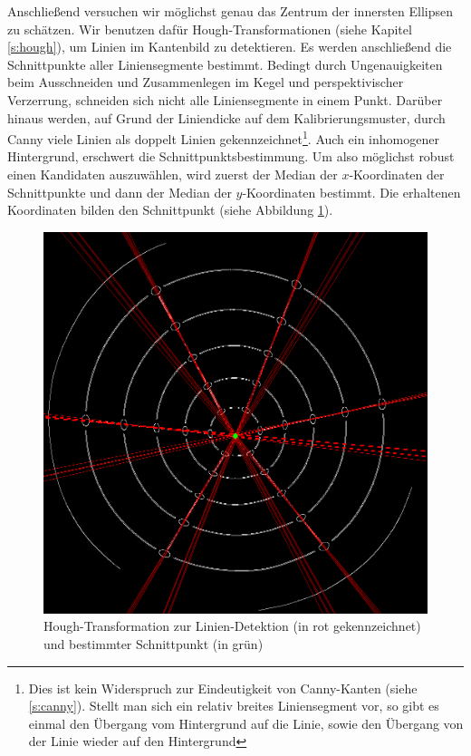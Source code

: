 Anschließend versuchen wir möglichst genau das Zentrum der innersten Ellipsen zu schätzen.
Wir benutzen dafür Hough-Transformationen (siehe Kapitel \ref{s:hough}), um Linien im Kantenbild zu detektieren.
Es werden anschließend die Schnittpunkte aller Liniensegmente bestimmt. Bedingt durch Ungenauigkeiten beim Ausschneiden und Zusammenlegen im Kegel und perspektivischer Verzerrung, schneiden sich nicht alle Liniensegmente in einem Punkt.
Darüber hinaus werden, auf Grund der Liniendicke auf dem Kalibrierungsmuster, durch Canny viele Linien als doppelt Linien gekennzeichnet\footnote{Dies ist kein Widerspruch zur Eindeutigkeit von Canny-Kanten (siehe \ref{s:canny}). Stellt man sich ein relativ breites Liniensegment vor, so gibt es einmal den Übergang vom Hintergrund auf die Linie, sowie den Übergang von der Linie wieder auf den Hintergrund}. Auch ein inhomogener Hintergrund, erschwert die Schnittpunktsbestimmung. Um also möglichst robust einen Kandidaten auszuwählen, wird zuerst der Median der $x$-Koordinaten der Schnittpunkte und dann der Median der $y$-Koordinaten bestimmt. Die erhaltenen Koordinaten bilden den Schnittpunkt (siehe Abbildung \ref{fig:houghLines}).

\begin{figure}[!htb]
	\centering
	\includegraphics[scale=.25]{images/houghLines.png}
	\caption{Hough-Transformation zur Linien-Detektion (in rot gekennzeichnet) und bestimmter Schnittpunkt (in grün) }
	\label{fig:houghLines}
\end{figure}

